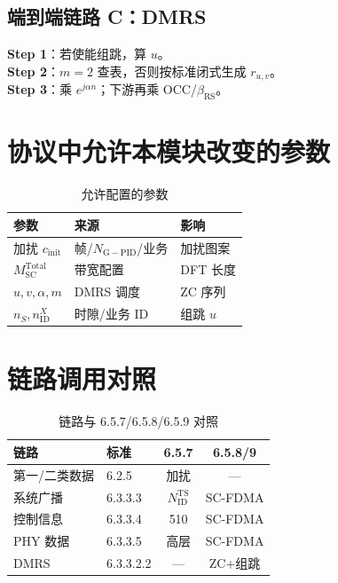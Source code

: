 \documentclass[11pt,a4paper]{ctexart}
\begin{document}
\subsection{端到端链路 C：DMRS}

\textbf{Step 1}：若使能组跳，算 $u$。\\
\textbf{Step 2}：$m{=}2$ 查表，否则按标准闭式生成 $r_{u,v}$。\\
\textbf{Step 3}：乘 $e^{j\alpha n}$；下游再乘 OCC/$β_{\mathrm{RS}}$。

\section{协议中允许本模块改变的参数}

\begin{longtable}{L{4cm}L{4cm}L{6cm}}
\caption{允许配置的参数\label{tab:6579-tunable}} \\
\toprule
\textbf{参数} & \textbf{来源} & \textbf{影响} \\
\midrule
加扰 $c_{\mathrm{init}}$ & 帧/$N_{\mathrm{G-PID}}$/业务 & 加扰图案 \\
$M_{\mathrm{SC}}^{\mathrm{Total}}$ & 带宽配置 & DFT 长度 \\
$u,v,\alpha,m$ & DMRS 调度 & ZC 序列 \\
$n_S,n_{\mathrm{ID}}^X$ & 时隙/业务 ID & 组跳 $u$ \\
\bottomrule
\end{longtable}

\section{链路调用对照}

\begin{longtable}{L{4cm}L{2.8cm}cc}
\caption{链路与 6.5.7/6.5.8/6.5.9 对照\label{tab:6579-link}} \\
\toprule
\textbf{链路} & \textbf{标准} & \textbf{6.5.7} & \textbf{6.5.8/9} \\
\midrule
第一/二类数据 & 6.2.5 & 加扰 & --- \\
系统广播 & 6.3.3.3 & $N_{\mathrm{ID}}^{\mathrm{TS}}$ & SC-FDMA \\
控制信息 & 6.3.3.4 & 510 & SC-FDMA \\
PHY 数据 & 6.3.3.5 & 高层 & SC-FDMA \\
DMRS & 6.3.3.2.2 & --- & ZC+组跳 \\
\bottomrule
\end{longtable}
\end{document}
